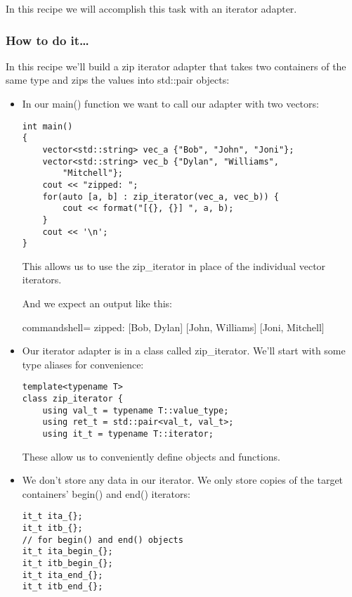 In this recipe we will accomplish this task with an iterator adapter.

\subsubsection{How to do it…}

In this recipe we'll build a zip iterator adapter that takes two containers of the same type  and zips the values into std::pair objects:

\begin{itemize}
\item 
In our main() function we want to call our adapter with two vectors:

\begin{lstlisting}[style=styleCXX]
int main()
{
	vector<std::string> vec_a {"Bob", "John", "Joni"};
	vector<std::string> vec_b {"Dylan", "Williams",
		"Mitchell"};
	cout << "zipped: ";
	for(auto [a, b] : zip_iterator(vec_a, vec_b)) {
		cout << format("[{}, {}] ", a, b);
	}
	cout << '\n';
}
\end{lstlisting}

This allows us to use the zip\_iterator in place of the individual vector iterators.

And we expect an output like this:

\begin{tcblisting}{commandshell={}}
zipped: [Bob, Dylan] [John, Williams] [Joni, Mitchell]
\end{tcblisting}

\item 
Our iterator adapter is in a class called zip\_iterator. We'll start with some type aliases for convenience:

\begin{lstlisting}[style=styleCXX]
template<typename T>
class zip_iterator {
	using val_t = typename T::value_type;
	using ret_t = std::pair<val_t, val_t>;
	using it_t = typename T::iterator;
\end{lstlisting}

These allow us to conveniently define objects and functions.

\item 
We don't store any data in our iterator. We only store copies of the target containers' begin() and end() iterators:

\begin{lstlisting}[style=styleCXX]
it_t ita_{};
it_t itb_{};
// for begin() and end() objects
it_t ita_begin_{};
it_t itb_begin_{};
it_t ita_end_{};
it_t itb_end_{};
\end{lstlisting}


\end{itemize}
